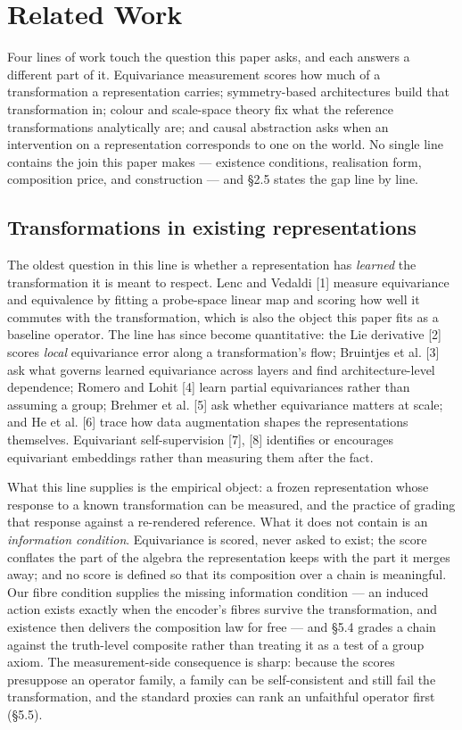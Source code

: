 \section{Related Work}

Four lines of work touch the question this paper asks, and each answers a different part of it. Equivariance measurement scores how much of a transformation a representation carries; symmetry-based architectures build that transformation in; colour and scale-space theory fix what the reference transformations analytically are; and causal abstraction asks when an intervention on a representation corresponds to one on the world. No single line contains the join this paper makes --- existence conditions, realisation form, composition price, and construction --- and \S{}2.5 states the gap line by line.

\subsection{Transformations in existing representations}

The oldest question in this line is whether a representation has \textit{learned} the transformation it is meant to respect. Lenc and Vedaldi [1] measure equivariance and equivalence by fitting a probe-space linear map and scoring how well it commutes with the transformation, which is also the object this paper fits as a baseline operator. The line has since become quantitative: the Lie derivative [2] scores \textit{local} equivariance error along a transformation's flow; Bruintjes et al. [3] ask what governs learned equivariance across layers and find architecture-level dependence; Romero and Lohit [4] learn partial equivariances rather than assuming a group; Brehmer et al. [5] ask whether equivariance matters at scale; and He et al. [6] trace how data augmentation shapes the representations themselves. Equivariant self-supervision [7], [8] identifies or encourages equivariant embeddings rather than measuring them after the fact.

What this line supplies is the empirical object: a frozen representation whose response to a known transformation can be measured, and the practice of grading that response against a re-rendered reference. What it does not contain is an \textit{information condition}. Equivariance is scored, never asked to exist; the score conflates the part of the algebra the representation keeps with the part it merges away; and no score is defined so that its composition over a chain is meaningful. Our fibre condition supplies the missing information condition --- an induced action exists exactly when the encoder's fibres survive the transformation, and existence then delivers the composition law for free --- and \S{}5.4 grades a chain against the truth-level composite rather than treating it as a test of a group axiom. The measurement-side consequence is sharp: because the scores presuppose an operator family, a family can be self-consistent and still fail the transformation, and the standard proxies can rank an unfaithful operator first (\S{}5.5).

